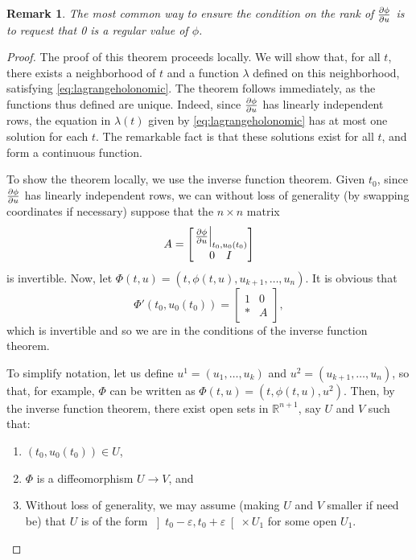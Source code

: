 \documentclass{article}
\theoremstyle{plain}
\newtheorem{remark}{Remark}
\theoremstyle{nonumberplain}
\newtheorem{proof}{Proof}
\newcommand{\R}{\mathbb{R}}
\DeclarePairedDelimiter\eval{.}{\rvert}
\begin{document}
\begin{remark}
The most common way to ensure the condition on the rank of $\diffp \phi u$ is to request that 0 is a regular value of $\phi$.
\end{remark}

\begin{proof}
The proof of this theorem proceeds locally. We will show that, for all $t$, there exists a neighborhood of $t$ and a function $\lambda$ defined on this neighborhood, satisfying \eqref{eq:lagrangeholonomic}. The theorem follows immediately, as the functions thus defined are unique. Indeed, since $\diffp \phi u$ has linearly independent rows, the equation in $\lambda(t)$ given by \eqref{eq:lagrangeholonomic} has at most one solution for each $t$. The remarkable fact is that these solutions exist for all $t$, and form a continuous function.

To show the theorem locally, we use the inverse function theorem. Given $t_0$, since $\diffp\phi u$ has linearly independent rows, we can without loss of generality (by swapping coordinates if necessary) suppose that the $n \times n$ matrix
\[
A = \begin{bmatrix}
\eval*{\diffp\phi u}_{t_0,u_0(t_0)}\\
\begin{matrix}
0 & I
\end{matrix}
\end{bmatrix}
\]
is invertible. Now, let $\Phi(t,u) = (t, \phi(t,u), u_{k+1}, \dots, u_n)$. It is obvious that
\[\Phi'(t_0, u_0(t_0)) =
\begin{bmatrix}
1 & 0\\
* & A
\end{bmatrix},\]
which is invertible and so we are in the conditions of the inverse function theorem.

To simplify notation, let us define $u^1 = (u_1, \dots, u_k)$ and $u^2 = (u_{k+1}, \dots, u_n)$, so that, for example, $\Phi$ can be written as $\Phi(t,u) = (t, \phi(t,u), u^2)$. Then, by the inverse function theorem, there exist open sets in $\R^{n+1}$, say $U$ and $V$ such that:
\begin{enumerate}
\item $(t_0, u_0(t_0)) \in U$,
\item $\Phi$ is a diffeomorphism $U \to V$, and
\item Without loss of generality, we may assume (making $U$ and $V$ smaller if need be) that $U$ is of the form $\left]t_0-\varepsilon, t_0+\varepsilon\right[ \times U_1$ for some open $U_1$.
\end{enumerate}


\end{proof}
\end{document}
